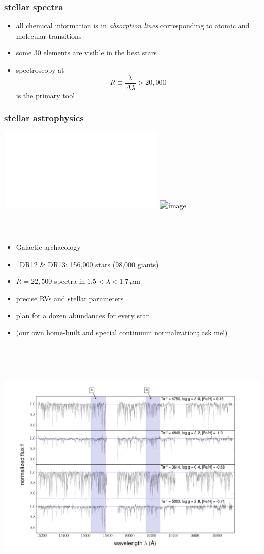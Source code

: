 \documentclass[pdftex]{beamer}
\begin{document}
\begin{frame}
  \frametitle{stellar spectra}
  \begin{itemize}
  \item all chemical information is in \emph{absorption lines} corresponding to atomic and molecular transitions
  \item some 30 elements are visible in the best stars
  \item spectroscopy at $$R\equiv\frac{\lambda}{\Delta\lambda}>20,000$$ is the primary tool
  \end{itemize}
\end{frame}

\begin{frame}
  \frametitle{stellar astrophysics}
  \,\hfill\includegraphics<1>[height=\figureheight]{../documents/paper1/plots/four_examples3.pdf}
         \includegraphics<2>[height=\figureheight]{../documents/paper1/plots/iso2_2.png}
\end{frame}

\begin{frame}
  \frametitle{\sdssiii\ \apogee}
  \begin{itemize}
  \item Galactic archaeology
  \item \apogee\ DR12 \& DR13: 156,000 stars (98,000 giants)
  \item $R=22,500$ spectra in $1.5<\lambda<1.7\,\mu\mathrm{m}$
  \item precise RVs and stellar parameters
  \item plan for a dozen abundances for every star
  \item (our own home-built and special continuum normalization; ask me!)
  \end{itemize}
\end{frame}

\begin{frame}
  \frametitle{\sdssiii\ \apogee}
  \,\hfill\includegraphics[height=\figureheight]{../documents/paper1/plots/four_examples3.pdf}
\end{frame}
\end{document}

